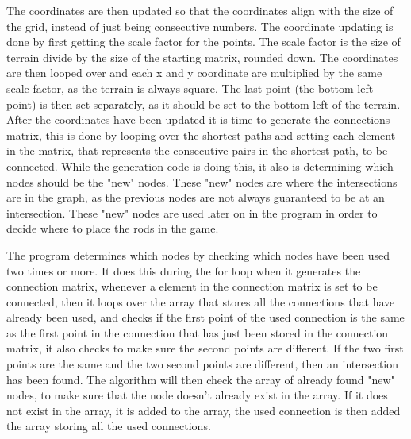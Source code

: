 
	The coordinates are then updated so that the coordinates align with the size of the grid, instead of just being consecutive numbers. The coordinate updating is done by first getting the scale factor for the points. The scale factor is the size of terrain divide by the size of the starting matrix, rounded down. The coordinates are then looped over and each x and y coordinate are multiplied by the same scale factor, as the terrain is always square. The last point (the bottom-left point) is then set separately, as it should be set to the bottom-left of the terrain. \\


	After the coordinates have been updated it is time to generate the connections matrix, this is done by looping over the shortest paths and setting each element in the matrix, that represents the consecutive pairs in the shortest path, to be connected. While the generation code is doing this, it also is determining which nodes should be the "new" nodes. These "new" nodes are where the intersections are in the graph, as the previous nodes are not always guaranteed to be at an intersection. These "new" nodes are used later on in the program in order to decide where to place the rods in the game.
	\newline
	\par
	The program determines which nodes by checking which nodes have been used two times or more. It does this during the for loop when it generates the connection matrix, whenever a element in the connection matrix is set to be connected, then it loops over the array that stores all the connections that have already been used, and checks if the first point of the used connection is the same as the first point in the connection that has just been stored in the connection matrix, it also checks to make sure the second points are different. If the two first points are the same and the two second points are different, then an intersection has been found. The algorithm will then check the array of already found "new" nodes, to make sure that the node doesn't already exist in the array. If it does not exist in the array, it is added to the array, the used connection is then added the array storing all the used connections.\\


